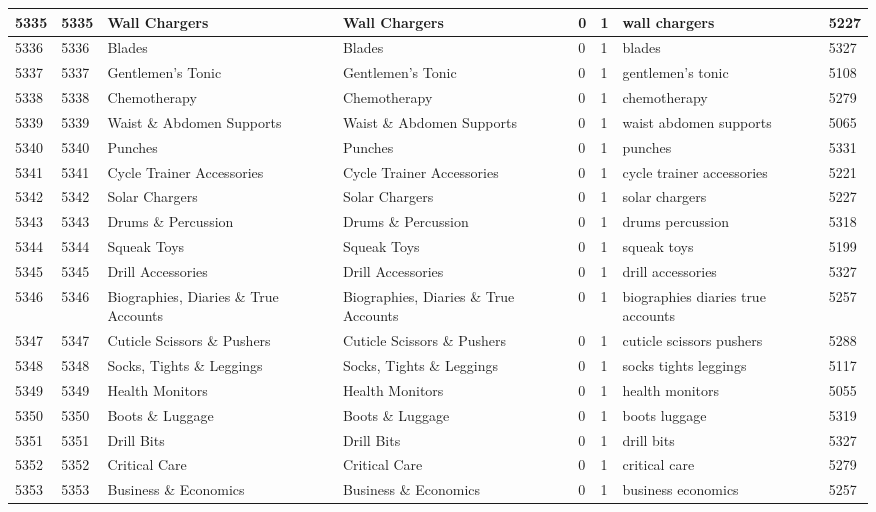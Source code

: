 \begin{longtable}{|l|l|l|l|l|l|l|l|}
5335 & 5335 & Wall Chargers & Wall Chargers & 0 & 1 & wall chargers & 5227 \\ \hline 
5336 & 5336 & Blades & Blades & 0 & 1 & blades & 5327 \\ \hline 
5337 & 5337 & Gentlemen’s Tonic & Gentlemen’s Tonic & 0 & 1 & gentlemen’s tonic & 5108 \\ \hline 
5338 & 5338 & Chemotherapy & Chemotherapy & 0 & 1 & chemotherapy & 5279 \\ \hline 
5339 & 5339 & Waist \& Abdomen Supports & Waist \& Abdomen Supports & 0 & 1 & waist abdomen supports & 5065 \\ \hline 
5340 & 5340 & Punches & Punches & 0 & 1 & punches & 5331 \\ \hline 
5341 & 5341 & Cycle Trainer Accessories & Cycle Trainer Accessories & 0 & 1 & cycle trainer accessories & 5221 \\ \hline 
5342 & 5342 & Solar Chargers & Solar Chargers & 0 & 1 & solar chargers & 5227 \\ \hline 
5343 & 5343 & Drums \& Percussion & Drums \& Percussion & 0 & 1 & drums percussion & 5318 \\ \hline 
5344 & 5344 & Squeak Toys & Squeak Toys & 0 & 1 & squeak toys & 5199 \\ \hline 
5345 & 5345 & Drill Accessories & Drill Accessories & 0 & 1 & drill accessories & 5327 \\ \hline 
5346 & 5346 & Biographies, Diaries \& True Accounts & Biographies, Diaries \& True Accounts & 0 & 1 & biographies diaries true accounts & 5257 \\ \hline 
5347 & 5347 & Cuticle Scissors \& Pushers & Cuticle Scissors \& Pushers & 0 & 1 & cuticle scissors pushers & 5288 \\ \hline 
5348 & 5348 & Socks, Tights \& Leggings & Socks, Tights \& Leggings & 0 & 1 & socks tights leggings & 5117 \\ \hline 
5349 & 5349 & Health Monitors & Health Monitors & 0 & 1 & health monitors & 5055 \\ \hline 
5350 & 5350 & Boots \& Luggage & Boots \& Luggage & 0 & 1 & boots luggage & 5319 \\ \hline 
5351 & 5351 & Drill Bits & Drill Bits & 0 & 1 & drill bits & 5327 \\ \hline 
5352 & 5352 & Critical Care & Critical Care & 0 & 1 & critical care & 5279 \\ \hline 
5353 & 5353 & Business \& Economics & Business \& Economics & 0 & 1 & business economics & 5257 \\ \hline 

\end{longtable}
